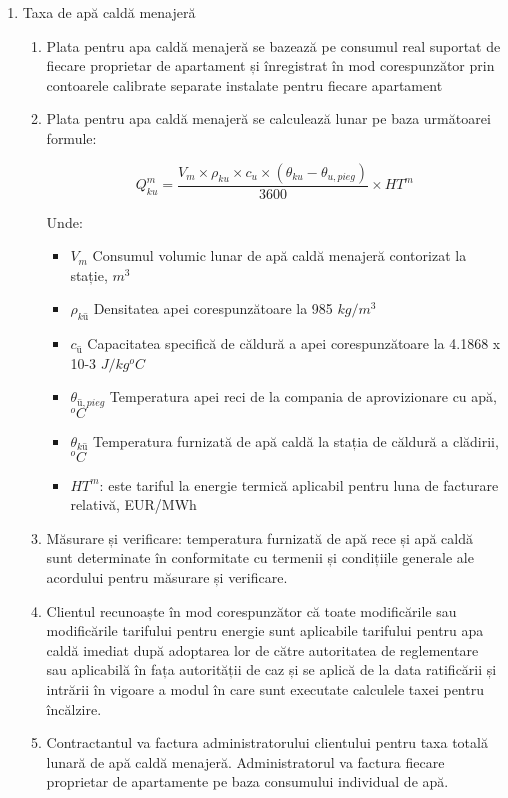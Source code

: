 \begin{enumerate}
\item Taxa de apă caldă menajeră

  \begin{enumerate}

  \item Plata pentru apa caldă menajeră se bazează pe consumul real suportat de fiecare proprietar de apartament și înregistrat în mod corespunzător prin contoarele calibrate separate instalate pentru fiecare apartament
    \item Plata pentru apa caldă menajeră se calculează lunar pe baza următoarei formule:

          \[ Q^{m}_{ku} = \frac{V_m \times \rho_{ku} \times c_u \times \left(\theta_{ku} - \theta_{u,pieg}\right)}{3600} \times HT^m \]

Unde:
\begin{itemize}[label={}]
  \item $V_m$ \quad \quad Consumul volumic lunar de apă caldă menajeră contorizat la stație, $m^3$
  \item $\rho_{kū}$ \quad \quad Densitatea apei corespunzătoare la 985 $kg/m^3$
  \item $c_ū$ \quad \quad Capacitatea specifică de căldură a apei corespunzătoare la 4.1868 x 10-3 $J/kg ^oC$
  \item $θ_{ū,pieg}$ \quad \quad Temperatura apei reci de la compania de aprovizionare cu apă, $^oC$ 
  \item $θ_{kū}$ \quad \quad Temperatura furnizată de apă caldă la stația de căldură a clădirii, $^oC$
  \item $HT^m$:    este tariful la energie termică aplicabil pentru luna de facturare relativă, EUR/MWh
\end{itemize}

\item Măsurare și verificare: temperatura furnizată de apă rece și apă caldă sunt determinate în conformitate cu termenii și condițiile generale ale acordului pentru măsurare și verificare.

\item Clientul recunoaște în mod corespunzător că toate modificările sau modificările tarifului pentru energie sunt aplicabile tarifului pentru apa caldă imediat după adoptarea lor de către autoritatea de reglementare sau aplicabilă în fața autorității de caz și se aplică de la data ratificării și intrării în vigoare a modul în care sunt executate calculele taxei pentru încălzire.

\item Contractantul va factura administratorului clientului pentru taxa totală lunară de apă caldă menajeră. Administratorul va factura fiecare proprietar de apartamente pe baza consumului individual de apă.


  \end{enumerate}
  
  
\end{enumerate}
